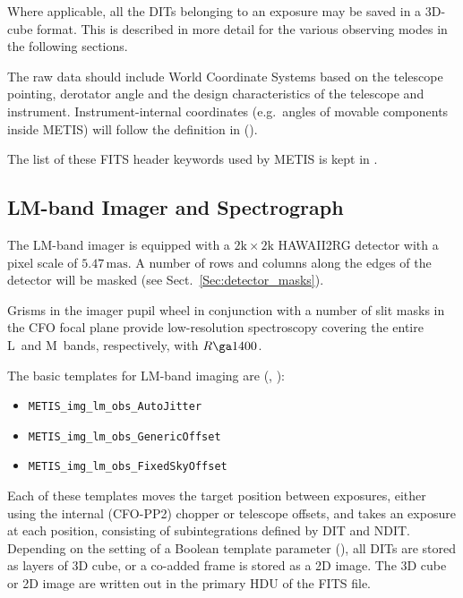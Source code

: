 Where applicable, all the DITs belonging to an exposure may be saved
in a 3D-cube format. This is described in more detail for the various
observing modes in the following sections.

The raw data should include World Coordinate Systems based on the
telescope pointing, derotator angle and the design characteristics of
the telescope and instrument. Instrument-internal coordinates
(e.g.~angles of movable components inside METIS) will follow the
definition in \cite{METIS-coordinates} ().

The list of these FITS header keywords used by METIS is kept in
\cite{METIS-DID}.




\subsection{LM-band Imager and Spectrograph}
\label{ssec:instrument_data_LM-IMG}

The LM-band imager is equipped with a $2\mathrm{k}\times2\mathrm{k}$
HAWAII2RG detector with a pixel scale of $5.47\,\mathrm{mas}$. A
number of rows and columns along the edges of the detector will be
masked (see Sect.~\ref{Sec:detector_masks}).

Grisms in the imager pupil wheel in conjunction with a number of slit
masks in the CFO focal plane provide low-resolution spectroscopy
covering the entire L~and M~bands, respectively, with $R\ga 1400$.

The basic templates for LM-band imaging are
(\cite{METIS-operational_concept}, \cite{METIS-template_manual}):
\begin{itemize}
\item \lstinline{METIS_img_lm_obs_AutoJitter}
\item \lstinline{METIS_img_lm_obs_GenericOffset}
\item \lstinline{METIS_img_lm_obs_FixedSkyOffset}
\end{itemize}

Each of these templates moves the target position between exposures,
either using the internal (CFO-PP2) chopper or telescope offsets, and
takes an exposure at each position, consisting of subintegrations
defined by DIT and NDIT. Depending on the setting of a Boolean
template parameter (), all DITs are stored as
layers of 3D cube, or a co-added frame is stored as a 2D image. The 3D
cube or 2D image are written out in the primary HDU of the FITS file.


